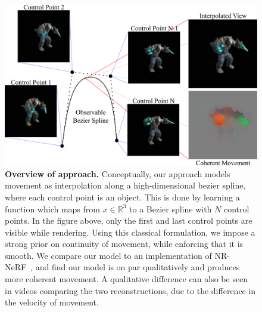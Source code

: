 \documentclass[runningheads]{llncs}
\begin{document}
\begin{figure}[!ht]
    \centering
    \includegraphics[width=\textwidth]{teaser}
    \caption{
    \label{fig:intro_figure}
    \textbf{Overview of approach.} Conceptually, our approach models movement as interpolation along a high-dimensional bezier spline, where each control point is an object. This is done by learning a function which maps from $x\in\mathbb{R}^3$ to a Bezier spline with $N$ control points. In the figure above, only the first and last control points are visible while rendering. Using this classical formulation, we impose a strong prior on continuity of movement, while enforcing that it is smooth. We compare our model to an implementation of NR-NeRF~\cite{tretschk2021nonrigid}, and find our model is on par qualitatively and produces more coherent movement. A qualitative difference can also be seen in videos comparing the two reconstructions, due to the difference in the velocity of movement.
    }
    \vspace{-3mm}
\end{figure}








{\small
    
    
}
\end{document}
